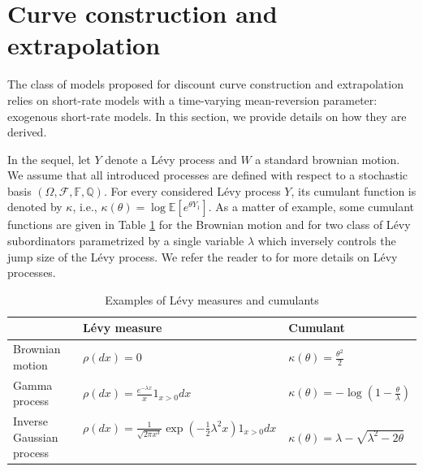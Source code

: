 \nocite{cousin2014}

\section{Curve construction and extrapolation}
\label{curveconstruction}

The class of models proposed for discount curve construction and extrapolation relies on short-rate models with a time-varying mean-reversion parameter: exogenous short-rate models. In this section, we provide details on how they are derived. 

\medskip

In the sequel, let $Y$ denote a  L{\'e}vy process and $W$ a standard brownian motion. We assume that all introduced processes are defined with respect to a stochastic basis $(\Omega,\mathcal{F},\mathbb{F},\mathbb{Q})$. 
For every considered  L{\'e}vy process $Y$, its cumulant function is denoted by $\kappa$, i.e., $\kappa(\theta)=\log\mathbb{E}\left[e^{\theta Y_1}\right]$. 
As a matter of example, some cumulant functions are given in Table \ref{Table:Levy} for the Brownian motion and for two class of L{\'e}vy subordinators parametrized by a single variable $\lambda$ which inversely controls the jump size of the L\'evy process. We refer the reader to \cite{Cont2003} for more details on L\'evy processes. 	
\begin{table}[h]	
\begin{center}
{\renewcommand{\arraystretch}{1.8}
\begin{tabular}{|l|l|l|}
\cline{2-3} \multicolumn{1}{c|}{}  & L{\'e}vy measure   & Cumulant \\
		\hline
		 Brownian motion &  $\rho(dx)=0 $ &  $\kappa(\theta)=\frac{\theta^2}{2}$  \\

		\hline
		 Gamma process &  $\rho(dx)=\frac{e^{-\lambda x}}{x}1_{x>0}dx$ &  $\kappa(\theta)=-\log\left(1- \frac{\theta}{\lambda}\right)$  \\
		 \hline
		 Inverse Gaussian process&   $\rho(dx)=\frac{1}{\sqrt{2 \pi x^3}}\exp\left(-\frac{1}{2} \lambda^2 x \right)1_{{x>0}}dx$\ & $\kappa(\theta)= \lambda-\sqrt{\lambda^2-2\theta}$   \\
		 \hline
		\end{tabular}
		}
\end{center}
\caption{Examples of L\'evy measures and cumulants}
\label{Table:Levy}	
\end{table}
